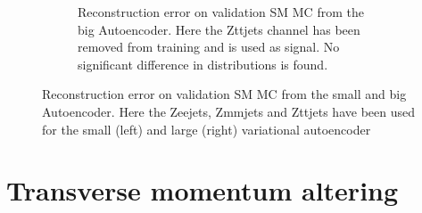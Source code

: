 \begin{figure}[H]
\begin{subfigure}{.45\textwidth}
        \caption{Reconstruction error on validation SM MC from the big Autoencoder. Here the Zttjets channel has been removed from training and 
        is used as signal. No significant difference in distributions is found. }
        \label{fig:vae_big_Zttjets}
    \end{subfigure}
    \hfill  
    \caption[VAE | Channel removal, Zeejets, Zmmjets, Zttjets]{Reconstruction error on validation SM MC from the small and big Autoencoder. 
    Here the Zeejets, Zmmjets and Zttjets have been used for the small (left) and large (right) variational autoencoder}
    \label{fig:vae_big_channel5}
\end{figure}

\section{Transverse momentum altering}\label{sec:pt_alter}

